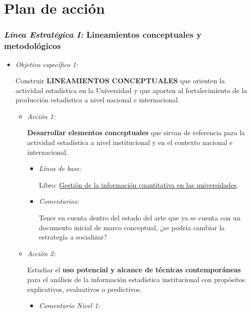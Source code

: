 \documentclass[
]{book}
\begin{document}
\hypertarget{Cap6}{%
\chapter{Plan de acción}\label{Cap6}}

\hypertarget{luxednea-estratuxe9gica-i-lineamientos-conceptuales-y-metodoluxf3gicos}{%
\subsection{\texorpdfstring{\emph{Línea Estratégica I:} Lineamientos conceptuales y metodológicos}{Línea Estratégica I: Lineamientos conceptuales y metodológicos}}\label{luxednea-estratuxe9gica-i-lineamientos-conceptuales-y-metodoluxf3gicos}}

\begin{itemize}
\item
  \emph{Objetivo específico 1:}

  Construir \textbf{LINEAMIENTOS CONCEPTUALES} que orienten
  la actividad estadística en la Universidad y que aporten al fortalecimiento de la producción estadística a nivel nacional e internacional.

  \begin{itemize}
  \item
    \emph{Acción 1:}

    \textbf{Desarrollar elementos conceptuales} que sirvan de referencia para la actividad estadística a nivel institucional y en el contexto nacional e internacional.

    \begin{itemize}
    \item
      \emph{Línea de base:}

      Libro: \href{https://estadisticaun.github.io/L_Conceptual/}{Gestión de la información cuantitativa en las universidades}.
    \item
      \emph{Comentarios:}

      Tener en cuenta dentro del estado del arte que ya se cuenta con un documento inicial de marco conceptual, ¿se podría cambiar la estrategía a socializar?
    \end{itemize}
  \item
    \emph{Acción 2:}

    Estudiar el \textbf{uso potencial y alcance de técnicas contemporáneas} para el análisis de la información estadística institucional con propósitos explicativos, evaluativos o predictivos.

    \begin{itemize}
    \item
      \emph{Comentario Nivel 1:}


\end{itemize}
\end{itemize}
\end{itemize}
\end{document}
